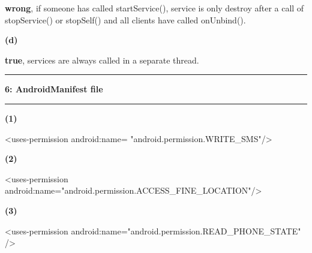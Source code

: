 \documentclass[11pt]{article}
\newcommand\question[2]{\vspace{.25in}\hrule\textbf{#1: #2}\vspace{.5em}\hrule\vspace{.10in}}
\renewcommand\part[1]{\vspace{.10in}\textbf{(#1)}}
\begin{document}
\textbf{wrong}, if someone has called startService(), service is only destroy after a call of stopService() or stopSelf() and all clients have called onUnbind().

\part{d}

\textbf{true}, services are always called in a separate thread.

\question{6}{AndroidManifest file}

\part{1}

 \textless uses-permission android:name= "android.permission.WRITE\_SMS"/\textgreater 

\part{2}

 \textless uses-permission android:name="android.permission.ACCESS\_FINE\_LOCATION"/\textgreater 

\part{3}

 \textless uses-permission android:name="android.permission.READ\_PHONE\_STATE" /\textgreater 
\end{document}
